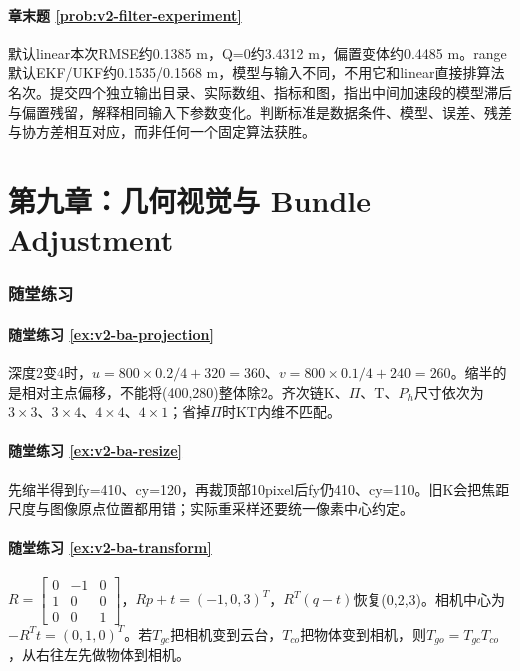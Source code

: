 \paragraph*{章末题 \ref{prob:v2-filter-experiment}}
\begin{solution}
默认linear本次RMSE约0.1385 m，Q=0约3.4312 m，偏置变体约0.4485 m。range默认EKF/UKF约0.1535/0.1568 m，模型与输入不同，不用它和linear直接排算法名次。提交四个独立输出目录、实际数组、指标和图，指出中间加速段的模型滞后与偏置残留，解释相同输入下参数变化。判断标准是数据条件、模型、误差、残差与协方差相互对应，而非任何一个固定算法获胜。
\end{solution}

\section*{第九章：几何视觉与 Bundle Adjustment}
{}
\subsubsection*{随堂练习}

\paragraph*{随堂练习 \ref{ex:v2-ba-projection}}
\begin{solution}
深度2变4时，$u=800\times0.2/4+320=360$、$v=800\times0.1/4+240=260$。缩半的是相对主点偏移，不能将(400,280)整体除2。齐次链K、$\Pi$、T、$P_h$尺寸依次为$3\times3$、$3\times4$、$4\times4$、$4\times1$；省掉$\Pi$时KT内维不匹配。
\end{solution}

\paragraph*{随堂练习 \ref{ex:v2-ba-resize}}
\begin{solution}
先缩半得到fy=410、cy=120，再裁顶部10pixel后fy仍410、cy=110。旧K会把焦距尺度与图像原点位置都用错；实际重采样还要统一像素中心约定。
\end{solution}

\paragraph*{随堂练习 \ref{ex:v2-ba-transform}}
\begin{solution}
$R=\left[\begin{smallmatrix}0&-1&0\\1&0&0\\0&0&1\end{smallmatrix}\right]$，$Rp+t=(-1,0,3)^T$，$R^T(q-t)$恢复(0,2,3)。相机中心为$-R^Tt=(0,1,0)^T$。若$T_{gc}$把相机变到云台，$T_{co}$把物体变到相机，则$T_{go}=T_{gc}T_{co}$，从右往左先做物体到相机。
\end{solution}

